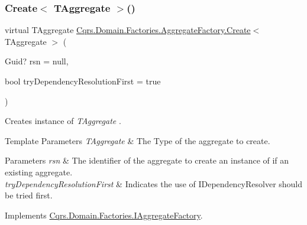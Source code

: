 \mbox{\label{classCqrs_1_1Domain_1_1Factories_1_1AggregateFactory_ac155d6c1e55ba37bacf420185b652092_ac155d6c1e55ba37bacf420185b652092}} 
\subsubsection{\texorpdfstring{Create$<$ T\+Aggregate $>$()}{Create< TAggregate >()}}
{\footnotesize\ttfamily virtual T\+Aggregate \hyperlink{classCqrs_1_1Domain_1_1Factories_1_1AggregateFactory_a917794af09bb3f51629e7abc231f8441_a917794af09bb3f51629e7abc231f8441}{Cqrs.\+Domain.\+Factories.\+Aggregate\+Factory.\+Create}$<$ T\+Aggregate $>$ (\begin{DoxyParamCaption}\item[{Guid?}]{rsn = {\ttfamily null},  }\item[{bool}]{try\+Dependency\+Resolution\+First = {\ttfamily true} }\end{DoxyParamCaption})\hspace{0.3cm}{\ttfamily [virtual]}}



Creates instance of {\itshape T\+Aggregate} . 


\begin{DoxyTemplParams}{Template Parameters}
{\em T\+Aggregate} & The Type of the aggregate to create.\\
\hline
\end{DoxyTemplParams}

\begin{DoxyParams}{Parameters}
{\em rsn} & The identifier of the aggregate to create an instance of if an existing aggregate.\\
\hline
{\em try\+Dependency\+Resolution\+First} & Indicates the use of I\+Dependency\+Resolver should be tried first.\\
\hline
\end{DoxyParams}


Implements \hyperlink{interfaceCqrs_1_1Domain_1_1Factories_1_1IAggregateFactory_a3dcbf8900e0d536da241e2e94f74cdd5_a3dcbf8900e0d536da241e2e94f74cdd5}{Cqrs.\+Domain.\+Factories.\+I\+Aggregate\+Factory}.



